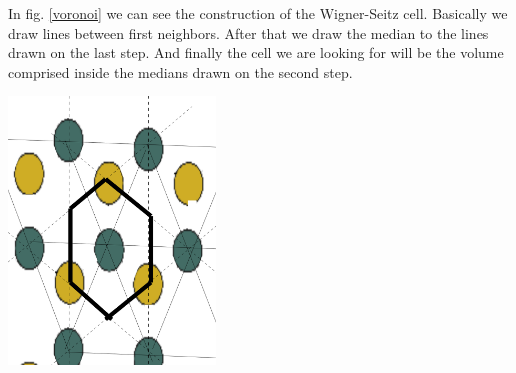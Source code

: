 \begin{questions}
\begin{solution}
\end{solution}


\begin{solution}

  In fig. \ref{voronoi} we can see the construction of the Wigner-Seitz cell. Basically we draw lines between first neighbors. After that we draw the median to the lines drawn on the last step. And finally the cell we are looking for will be the volume comprised inside the medians drawn on the second step.

  \begin{center}
    \includegraphics[width=55mm]{voronoi}
  \end{center}

  \label{voronoi}
\end{solution}

\end{questions}

%
%

